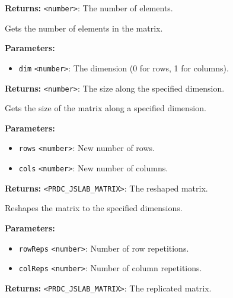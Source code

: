 \documentclass[12pt,a4paper]{article}
\begin{document}
\noindent \textbf{Returns:} \texttt{<number>}: The number of elements.

\noindent Gets the number of elements in the matrix.

\vspace{5mm}
\noindent {}


\noindent \textbf{Parameters:}
\begin{itemize}
  \item \texttt{dim} \texttt{<number>}: The dimension (0 for rows, 1 for columns).
\end{itemize}

\noindent \textbf{Returns:} \texttt{<number>}: The size along the specified dimension.

\noindent Gets the size of the matrix along a specified dimension.

\vspace{5mm}
\noindent {}


\noindent \textbf{Parameters:}
\begin{itemize}
  \item \texttt{rows} \texttt{<number>}: New number of rows.
  \item \texttt{cols} \texttt{<number>}: New number of columns.
\end{itemize}

\noindent \textbf{Returns:} \texttt{<PRDC\_JSLAB\_MATRIX>}: The reshaped matrix.

\noindent Reshapes the matrix to the specified dimensions.

\vspace{5mm}
\noindent {}


\noindent \textbf{Parameters:}
\begin{itemize}
  \item \texttt{rowReps} \texttt{<number>}: Number of row repetitions.
  \item \texttt{colReps} \texttt{<number>}: Number of column repetitions.
\end{itemize}

\noindent \textbf{Returns:} \texttt{<PRDC\_JSLAB\_MATRIX>}: The replicated matrix.
\end{document}
